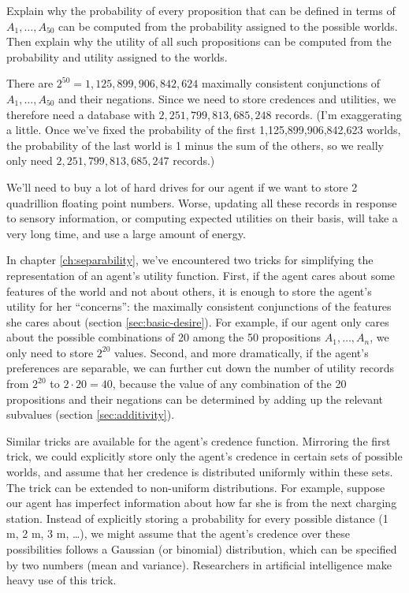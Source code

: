 \begin{exercise3}
  Explain why the probability of every proposition that can be defined
  in terms of $A_1,\ldots,A_{50}$ can be computed from the probability
  assigned to the possible worlds. Then explain why the utility of all
  such propositions can be computed from the probability and utility
  assigned to the worlds. 
\end{exercise3}


There are $2^{50} = 1,125,899,906,842,624$ maximally consistent
conjunctions of $A_1,\ldots,A_{50}$ and their negations. Since we need
to store credences and utilities, we therefore need a database with
$2,251,799,813,685,248$ records. (I'm exaggerating a little. Once
we've fixed the probability of the first 1,125,899,906,842,623 worlds,
the probability of the last world is 1 minus the sum of the others, so
we really only need $2,251,799,813,685,247$ records.)

We'll need to buy a lot of hard drives for our agent if we want to
store 2 quadrillion floating point numbers. Worse, updating all these
records in response to sensory information, or computing expected
utilities on their basis, will take a very long time, and use a large
amount of energy.

In chapter \ref{ch:separability}, we've encountered two tricks for
simplifying the representation of an agent's utility function. First,
if the agent cares about some features of the world and not about
others, it is enough to store the agent's utility for her
``concerns'': the maximally consistent conjunctions of the features
she cares about (section \ref{sec:basic-desire}). For example,
if our agent only cares about the possible combinations of 20 among
the 50 propositions $A_1,\ldots,A_n$, we only need to store $2^{20}$
values. Second, and more dramatically, if the agent's preferences are
separable, we can further cut down the number of utility records from
$2^{20}$ to $2 \cdot 20 = 40$, because the value of any combination of
the 20 propositions and their negations can be determined by adding up
the relevant subvalues (section \ref{sec:additivity}).

Similar tricks are available for the agent's credence
function. Mirroring the first trick, we could explicitly store only
the agent's credence in certain sets of possible worlds, and assume
that her credence is distributed uniformly within these sets. The
trick can be extended to non-uniform distributions. For example,
suppose our agent has imperfect information about how far she is from
the next charging station. Instead of explicitly storing a probability
for every possible distance (1 m, 2 m, 3 m, \ldots), we might assume
that the agent's credence over these possibilities follows a Gaussian
(or binomial) distribution, which can be specified by two numbers
(mean and variance). Researchers in artificial intelligence make heavy
use of this trick.

